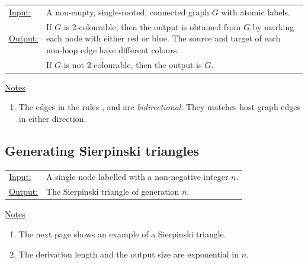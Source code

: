 \begin{tabular}{lp{10.5cm}}
\ul{Input:} & A non-empty, single-rooted, connected graph $G$ with atomic labels. \\
\ul{Output:} & If $G$\/ is 2-colourable, then the output is obtained from $G$\/ by marking each node with either red or blue. The source and target of each non-loop edge have different colours.\\
& If $G$\/ is not 2-colourable, then the output is $G$.
\end{tabular}

\begin{center}

\end{center}

\ul{Notes}
\begin{enumerate}
\setlength{\itemsep}{-.5ex}
\item The edges in the rules ,  and  are \emph{bidirectional}. They matches host graph edges in either direction.
\end{enumerate}


\subsection{Generating Sierpinski triangles}

\begin{tabular}{lp{10.5cm}}
\ul{Input:} & A single node labelled with a non-negative integer $n$. \\
\ul{Output:} & The Sierpinski triangle of generation $n$.
\end{tabular}
  
\begin{center}

\end{center}

\ul{Notes}
\begin{enumerate}
\setlength{\itemsep}{-.5ex}
\item The next page shows an example of a Sierpinski triangle.
\item The derivation length and the output size are exponential in $n$.
\end{enumerate}

